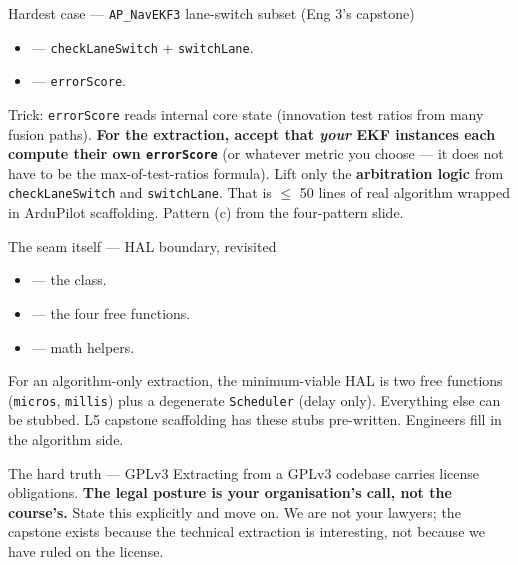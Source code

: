 \documentclass[aspectratio=169,11pt]{beamer}
\begin{document}
\begin{frame}{Hardest case --- \texttt{AP\_NavEKF3} lane-switch subset (Eng 3's capstone)}
  \begin{itemize}
    \item {} --- \texttt{checkLaneSwitch} + \texttt{switchLane}.
    \item {} --- \texttt{errorScore}.
  \end{itemize}
  \vfill
  Trick: \texttt{errorScore} reads internal core state (innovation test ratios from many fusion paths).
  \vfill
  \textbf{For the extraction, accept that \emph{your} EKF instances each compute their own \texttt{errorScore}} (or whatever metric you choose --- it does not have to be the max-of-test-ratios formula).
  \vfill
  Lift only the \textbf{arbitration logic} from \texttt{checkLaneSwitch} and \texttt{switchLane}. That is $\leq$ 50 lines of real algorithm wrapped in ArduPilot scaffolding. Pattern (c) from the four-pattern slide.
\end{frame}

\begin{frame}{The seam itself --- HAL boundary, revisited}
  \begin{itemize}
    \item {} --- the class.
    \item {} --- the four free functions.
    \item {} --- math helpers.
  \end{itemize}
  \vfill
  For an algorithm-only extraction, the minimum-viable HAL is two free functions (\texttt{micros}, \texttt{millis}) plus a degenerate \texttt{Scheduler} (delay only). Everything else can be stubbed.
  \vfill
  L5 capstone scaffolding has these stubs pre-written. Engineers fill in the algorithm side.
\end{frame}

\begin{frame}[allowframebreaks]{The hard truth --- GPLv3}
  Extracting from a GPLv3 codebase carries license obligations.
  \vfill
  \textbf{The legal posture is your organisation's call, not the course's.}
  \vfill
  State this explicitly and move on. We are not your lawyers; the capstone exists because the technical extraction is interesting, not because we have ruled on the license.
\end{frame}
\end{document}
